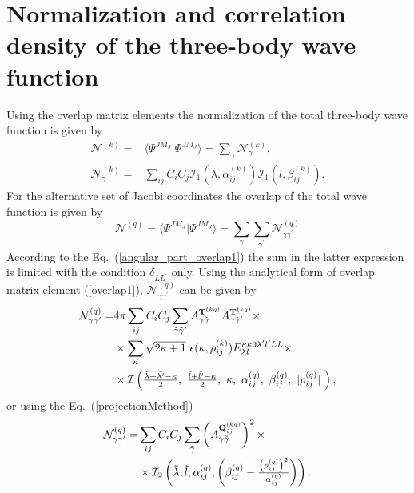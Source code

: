 \documentclass[
12pt, %
oneside, %
english, %
onehalfspacing, %
onehalfspacing, %
headsepline, %
]{MastersDoctoralThesis} %
\begin{document}
\section{Normalization and correlation density of the three-body wave function}
Using the overlap matrix elements the normalization of the total three-body wave function is given by
\begin{align}
\mathcal{N}^{(k)}= & \langle \Psi^{JM_J} \vert \Psi^{JM_J} \rangle = \sum_{\gamma} \mathcal{N}^{(k)}_{\gamma},    \nonumber \\
 \mathcal{N}^{(k)}_{\gamma} = & \sum_{ij} C_i C_j 
 \mathcal{I}_1 \left( \lambda,\alpha_{ij}^{(k)} \right)
 \mathcal{I}_1 \left( l,\beta_{ij}^{(k)} \right).
\end{align}
For the alternative set of Jacobi coordinates the overlap of the total wave function is given by
\begin{equation}
\mathcal{N}^{(q)}= \langle \Psi^{JM_J} \vert \Psi^{JM_J} \rangle = \sum_{\gamma} \sum_{\gamma^{\prime}} \mathcal{N}^{(q)}_{\gamma \gamma^{\prime}}
\end{equation}
According to the Eq.~(\ref{angular_part_overlap1}) the sum in the latter expression is limited with the condition $\delta_{LL^{\prime}}$ only. Using the analytical form  of overlap matrix element (\ref{overlap1}), $\mathcal{N}^{(q)}_{\gamma \gamma^{\prime}}$ can be given by
\begin{align}
\mathcal{N}^{(q)}_{\gamma \gamma^{\prime}}= & 4 \pi \sum_{ij} C_i C_j \sum_{\tilde{\gamma}\tilde{\gamma}^{\prime}}  A_{\gamma\tilde{\gamma}}^{ {\bf T}^{(kq)} } A_{\gamma\tilde{\gamma}^{\prime}}^{ {\bf T}^{(kq)}} \times
\nonumber \\
 & \times \sum_{\kappa} \sqrt{2\kappa+1}~ \epsilon(\kappa, \rho^{(k)}_{ij}) {E}^{\kappa \kappa 0 \lambda^{\prime} l^{\prime} L L}_{\lambda l} \times  \nonumber 
 \\ & \times \mathcal{I}\left(
 \tfrac{\tilde{\lambda}+\tilde{\lambda^{\prime}}-\kappa}{2}, ~
 \tfrac{\tilde{l}+\tilde{l^{\prime}}-\kappa}{2},~
 \kappa,~
 \alpha^{(q)}_{ij},~
 \beta^{(q)}_{ij} ,~
 \vert \rho^{(q)}_{ij} \vert ~
  \right),
\end{align}
or using the Eq.~(\ref{projectionMethod})
\begin{align}
\mathcal{N}^{(q)}_{\gamma \gamma^{\prime}}= & \sum_{ij} C_i C_j  \sum_{\tilde{\gamma}}
\left( A_{\gamma\tilde{\gamma}}^{ {\bf Q}_{ij}^{(kq)}} \right)^2
 \times\nonumber \\
 & \times
  \mathcal{I}_2 \left( \tilde{\lambda}, \tilde{l}, \alpha^{(q)}_{ij}, \left(  \beta^{(q)}_{ij} - \tfrac{\left(\rho^{(q)}_{ij}\right)^2}{\alpha^{(q)}_{ij}} \right) \right).
\end{align}  
\end{document}
